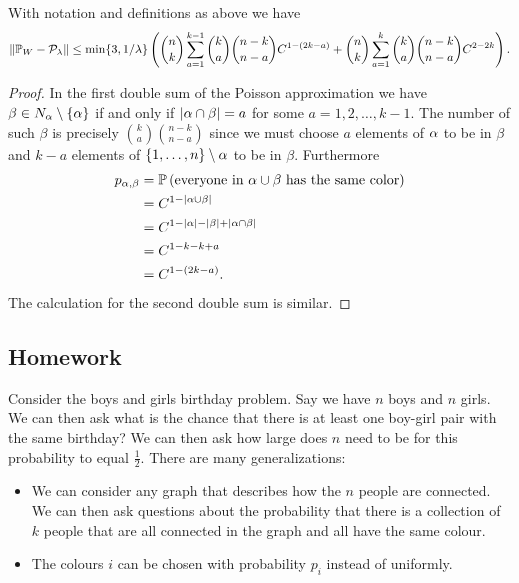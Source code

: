 \begin{prop}
    With notation and definitions as above we have 
    \[\left\|{\mathbb{P}}_W - {\mathcal{P}}_\lambda\right\| \le \min\{3, 1/\lambda\} \left(\binom{n}{k}\sum_{a=1}^{k-1} \binom{k}{a}\binom{n-k}{n-a} C^{1-(2k-a)}+\binom{n}{k}\sum_{a=1}^{k}\binom{k}{a}\binom{n-k}{n-a} C^{2-2k}\right). \]
\end{prop}
\begin{proof}
    In the first double sum of the Poisson approximation we have $\beta \in N_{\alpha} \setminus \{{\alpha}\}$ if and only if ${\left\lvert{\alpha} \cap \beta\right\rvert}=a$ for some $a = 1,2,\ldots,k-1$. The number of such $\beta$ is precisely $\binom{k}{a}\binom{n-k}{n-a}$ since we must choose $a$ elements of ${\alpha}$ to be in $\beta$ and $k-a$ elements of $\{1,\ldots,n\} \setminus {\alpha}$ to be in $\beta$. Furthermore
    \begin{align*}
        p_{{\alpha},\beta}&= {\mathbb{P}}\left(\text{everyone in } {\alpha} \cup \beta \text{ has the same color}\right)\\
        &=C^{1-{\left\lvert{\alpha} \cup \beta\right\rvert}}\\
        &=C^{1-{\left\lvert{\alpha}\right\rvert}-{\left\lvert\beta\right\rvert}+{\left\lvert{\alpha} \cap \beta\right\rvert}}\\
        &=C^{1-k-k+a}\\
        &=C^{1-(2k-a)}.
    \end{align*}
    The calculation for the second double sum is similar.
\end{proof}
\subsection{Homework}
Consider the boys and girls birthday problem. Say we have $n$ boys and $n$ girls. We can then ask what is the chance that there is at least one boy-girl pair with the same birthday? We can then ask how large does $n$ need to be for this probability to equal $\frac{1}{2}$. There are many generalizations:
\begin{itemize}
    \item We can consider any graph that describes how the $n$ people are connected. We can then ask questions about the probability that there is a collection of $k$ people that are all connected in the graph and all have the same colour.
    \item The colours $i$ can be chosen with probability $p_i$ instead of uniformly. 
\end{itemize}
